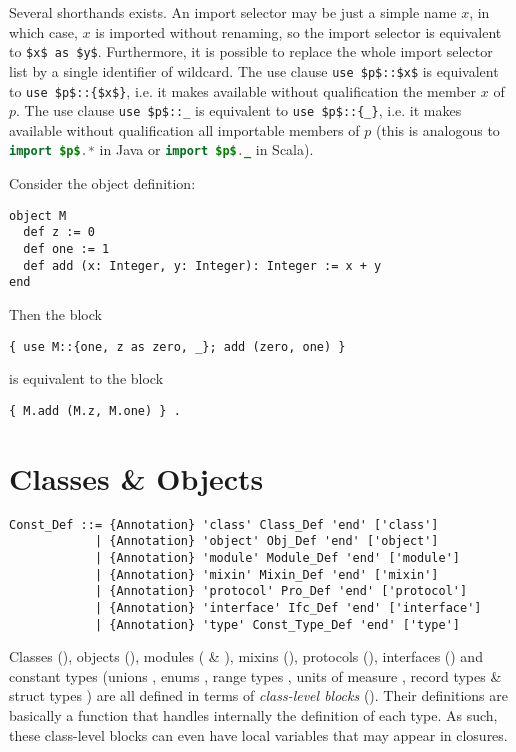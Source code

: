 Several shorthands exists. An import selector may be just a simple name $x$, in which case, $x$ is imported without renaming, so the import selector is equivalent to \lstinline!$x$ as $y$!. Furthermore, it is possible to replace the whole import selector list by a single identifier of wildcard. The use clause \lstinline!use $p$::$x$! is equivalent to \lstinline!use $p$::{$x$}!, i.e. it makes available without qualification the member $x$ of $p$. The use clause \lstinline!use $p$::_! is equivalent to \lstinline!use $p$::{_}!, i.e. it makes available without qualification all importable members of $p$ (this is analogous to \lstinline[language=Java]!import $p$.*! in Java or \lstinline[language=Java]!import $p$._! in Scala). 

\example Consider the object definition:
\begin{lstlisting}
object M
  def z := 0
  def one := 1
  def add (x: Integer, y: Integer): Integer := x + y
end
\end{lstlisting}
Then the block
\begin{lstlisting}
{ use M::{one, z as zero, _}; add (zero, one) }
\end{lstlisting}
is equivalent to the block
\begin{lstlisting}
{ M.add (M.z, M.one) } .
\end{lstlisting}


\chapter{Classes \& Objects}

\syntax\begin{lstlisting}
Const_Def ::= {Annotation} 'class' Class_Def 'end' ['class']
            | {Annotation} 'object' Obj_Def 'end' ['object']
            | {Annotation} 'module' Module_Def 'end' ['module']
            | {Annotation} 'mixin' Mixin_Def 'end' ['mixin']
            | {Annotation} 'protocol' Pro_Def 'end' ['protocol']
            | {Annotation} 'interface' Ifc_Def 'end' ['interface']
            | {Annotation} 'type' Const_Type_Def 'end' ['type']
\end{lstlisting}

Classes (), objects (), modules ( \& ), mixins (), protocols (), interfaces () and constant types (unions , enums , range types , units of measure , record types  \& struct types ) are all defined in terms of {\em class-level blocks} (). Their definitions are basically a function that handles internally the definition of each type. As such, these class-level blocks can even have local variables that may appear in closures. 

